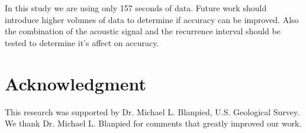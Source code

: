 \documentclass[]{llncs} %
\begin{document}


%
In this study we are using only 157 seconds of data. Future work should introduce higher volumes of data to determine if accuracy can be improved. Also the combination of the acoustic signal and the recurrence interval should be tested to determine it's affect on accuracy.
\par

\section{Acknowledgment}
This research was supported by Dr. Michael L. Blanpied,  U.S. Geological Survey. We thank Dr. Michael L. Blanpied for comments that greatly improved our work.



\end{document}
